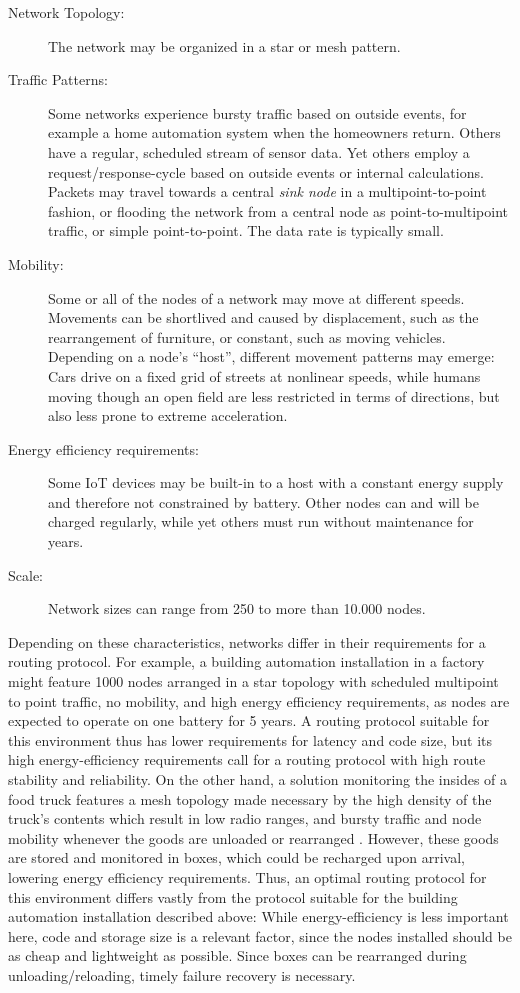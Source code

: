 \documentclass{acm_proc_article-sp}
\begin{document}
\begin{description}
\item[Network Topology:] The network may be organized in a star or mesh pattern.
\item[Traffic Patterns:] Some networks experience bursty traffic based on outside events, for example a home automation system when the homeowners return. Others have a regular, scheduled stream of sensor data. Yet others employ a request/response-cycle based on outside events or internal calculations. Packets may travel towards a central \emph{sink node} in a multipoint-to-point fashion, or flooding the network from a central node as point-to-multipoint traffic, or simple point-to-point. The data rate is typically small.
\item[Mobility:] Some or all of the nodes of a network may move at different speeds. Movements can be shortlived and caused by displacement, such as the rearrangement of furniture, or constant, such as moving vehicles. Depending on a node's ``host'', different movement patterns may emerge: Cars drive on a fixed grid of streets at nonlinear speeds, while humans moving though an open field are less restricted in terms of directions, but also less prone to extreme acceleration.
\item[Energy efficiency requirements:] Some IoT devices may be built-in to a host with a constant energy supply and therefore not constrained by battery. Other nodes can and will be charged regularly, while yet others must run without maintenance for years.
\item[Scale:] Network sizes can range from 250 to more than 10.000 nodes.
\end{description}

Depending on these characteristics, networks differ in their requirements for a routing protocol. For example, a building automation installation in a factory might feature 1000 nodes arranged in a star topology with scheduled multipoint to point traffic, no mobility, and high energy efficiency requirements, as nodes are expected to operate on one battery for 5 years\cite{RFC-5867}. A routing protocol suitable for this environment thus has lower requirements for latency and code size, but its high energy-efficiency requirements call for a routing protocol with high route stability and reliability.
On the other hand, a solution monitoring the insides of a food truck features a mesh topology made necessary by the high density of the truck's contents which result in low radio ranges, and bursty traffic and node mobility whenever the goods are unloaded or rearranged \cite{food_monitoring}. However, these goods are stored and monitored in boxes, which could be recharged upon arrival, lowering energy efficiency requirements. Thus, an optimal routing protocol for this environment differs vastly from the protocol suitable for the building automation installation described above: While energy-efficiency is less important here, code and storage size is a relevant factor, since the nodes installed should be as cheap and lightweight as possible. Since boxes can be rearranged during unloading/reloading, timely failure recovery is necessary.
\end{document}
